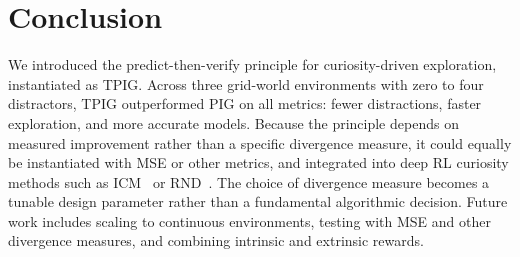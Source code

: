\documentclass[letterpaper]{article}
\begin{document}
\section{Conclusion}

We introduced the predict-then-verify principle for curiosity-driven
exploration, instantiated as TPIG.  Across three grid-world
environments with zero to four distractors, TPIG outperformed PIG on
all metrics: fewer distractions, faster exploration, and more accurate
models.  Because
the principle depends on measured improvement rather than a specific
divergence measure, it could equally be instantiated with MSE or other
metrics, and integrated into deep RL curiosity methods such as
ICM~\cite{Pathak2017ICM} or RND~\cite{Burda2019RND}.  The choice of divergence measure becomes a tunable design parameter
rather than a fundamental algorithmic decision.  Future work includes
scaling to continuous environments, testing with MSE and other
divergence measures, and combining intrinsic and extrinsic rewards.




\end{document}
